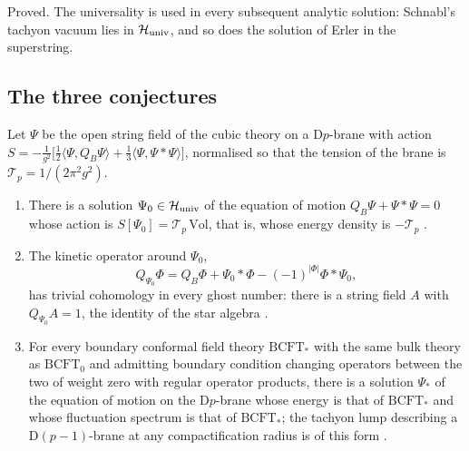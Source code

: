 \begin{verdict}[claim 11]
Proved. The universality is used in every subsequent analytic solution: Schnabl's tachyon vacuum lies in $\mathcal H_{\rm univ}$, and so does the solution of Erler in the superstring.
\end{verdict}

\subsection{The three conjectures}\label{ssec:threeconj}

Let $\Psi$ be the open string field of the cubic theory on a D$p$-brane with action $S = -\frac{1}{g^2}\big[\frac12\langle\Psi,Q_B\Psi\rangle + \frac13\langle\Psi,\Psi*\Psi\rangle\big]$, normalised so that the tension of the brane is $\mathcal T_p = 1/(2\pi^2 g^2)$.

\begin{theorem}[claims 12, 13, 14]\label{thm:threeconj}
\begin{enumerate}[label=(\roman*),leftmargin=2em]
\item There is a solution $\Psi_0\in\mathcal H_{\rm univ}$ of the equation of motion $Q_B\Psi + \Psi*\Psi = 0$ whose action is $S[\Psi_0] = \mathcal T_p\,\mathrm{Vol}$, that is, whose energy density is $-\mathcal T_p$ \cite{Schnabl05}.
\item The kinetic operator around $\Psi_0$,
\[
Q_{\Psi_0}\Phi = Q_B\Phi + \Psi_0*\Phi - (-1)^{|\Phi|}\Phi*\Psi_0 ,
\]
has trivial cohomology in every ghost number: there is a string field $A$ with $Q_{\Psi_0}A = 1$, the identity of the star algebra \cite{EllwoodSchnabl07}.
\item For every boundary conformal field theory $\mathrm{BCFT}_*$ with the same bulk theory as $\mathrm{BCFT}_0$ and admitting boundary condition changing operators between the two of weight zero with regular operator products, there is a solution $\Psi_*$ of the equation of motion on the D$p$-brane whose energy is that of $\mathrm{BCFT}_*$ and whose fluctuation spectrum is that of $\mathrm{BCFT}_*$; the tachyon lump describing a D$(p-1)$-brane at any compactification radius is of this form \cite{ErlerMaccaferri14}.
\end{enumerate}
\end{theorem}

